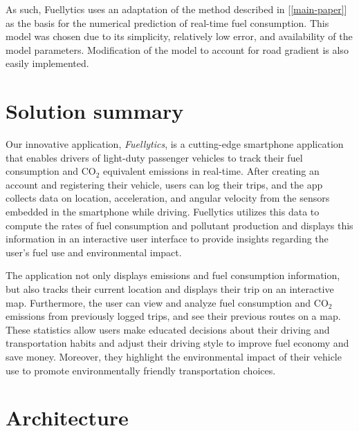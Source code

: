 \documentclass[11pt, oneside]{article}
\begin{document}
As such, Fuellytics uses an adaptation of the method described in [\ref*{main-paper}] as the basis for the numerical prediction of real-time fuel consumption.  This model was chosen due to its simplicity, relatively low error, and availability of the model parameters.  Modification of the model to account for road gradient is also easily implemented.

\section{Solution summary}

Our innovative application, \textit{Fuellytics}, is a cutting-edge smartphone application that enables drivers of light-duty passenger vehicles to track their fuel consumption and CO$_2$ equivalent emissions in real-time.  After creating an account and registering their vehicle, users can log their trips, and the app collects data on location, acceleration, and angular velocity from the sensors embedded in the smartphone while driving.  Fuellytics utilizes this data to compute the rates of fuel consumption and pollutant production and displays this information in an interactive user interface to provide insights regarding the user's fuel use and environmental impact. 

The application not only displays emissions and fuel consumption information, but also tracks their current location and displays their trip on an interactive map.  Furthermore, the user can view and analyze fuel consumption and CO$_2$ emissions from previously logged trips, and see their previous routes on a map. These statistics allow users make educated decisions about their driving and transportation habits and adjust their driving style to improve fuel economy and save money.  Moreover, they highlight the environmental impact of their vehicle use to promote environmentally friendly transportation choices.

\section{Architecture}
\end{document}
